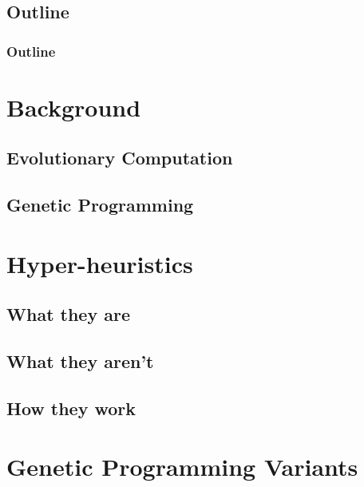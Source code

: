 \documentclass{beamer}
\begin{document}
\subsection*{Outline}

\begin{frame}
	\frametitle{Outline}
	\tableofcontents[hideallsubsections]
\end{frame}

\section[Background]{Background}

\subsection{Evolutionary Computation}


\subsection{Genetic Programming}


\section[Hyper-heuristics]{Hyper-heuristics}

\subsection{What they are}
\subsection{What they aren't}
\subsection{How they work}


\section[GP Variants]{Genetic Programming Variants}
\end{document}
